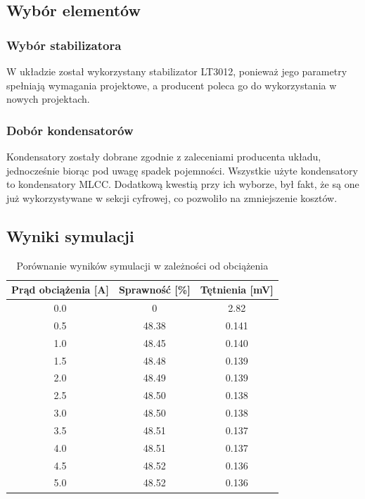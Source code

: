 \documentclass{article}
\begin{document}
\subsection{Wybór elementów}
\subsubsection{Wybór stabilizatora}
W układzie został wykorzystany stabilizator LT3012, ponieważ jego parametry spełniają wymagania projektowe, a producent poleca go do wykorzystania w nowych projektach.

\subsubsection{Dobór kondensatorów}
Kondensatory zostały dobrane zgodnie z zaleceniami producenta układu, jednocześnie biorąc pod uwagę spadek pojemności. Wszystkie użyte kondensatory to kondensatory MLCC. Dodatkową kwestią przy ich wyborze, był fakt, że są one już wykorzystywane w sekcji cyfrowej, co pozwoliło na zmniejszenie kosztów.
\subsection{Wyniki symulacji}
\begin{table}[H]
    \centering
    \caption{Porównanie wyników symulacji w zależności od obciążenia}
    \label{tab:efficiency_ripple}
    \begin{tabular}{ccc}
        \toprule
        \textbf{Prąd obciążenia [A]} & \textbf{Sprawność [\%]} & \textbf{Tętnienia [mV]} \\
        \midrule
        0.0                          & 0                       & 2.82                    \\
        0.5                          & 48.38                   & 0.141                   \\
        1.0                          & 48.45                   & 0.140                   \\
        1.5                          & 48.48                   & 0.139                   \\
        2.0                          & 48.49                   & 0.139                   \\
        2.5                          & 48.50                   & 0.138                   \\
        3.0                          & 48.50                   & 0.138                   \\
        3.5                          & 48.51                   & 0.137                   \\
        4.0                          & 48.51                   & 0.137                   \\
        4.5                          & 48.52                   & 0.136                   \\
        5.0                          & 48.52                   & 0.136                   \\
        \bottomrule
    \end{tabular}
\end{table}
\end{document}
